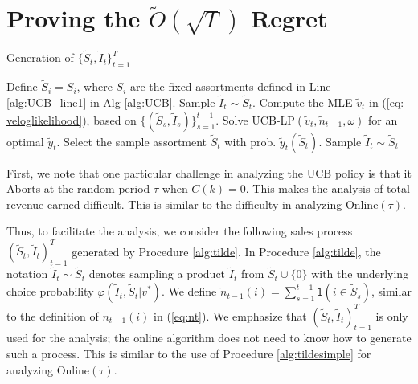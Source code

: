 \documentclass{article}
\makeatletter
\newenvironment{procedure}[1][htb]{%
    \renewcommand{\ALG@name}{Procedure}%
   \begin{algorithm}[#1]%
  }{\end{algorithm}}
\theoremstyle{definition}
\makeatother
\begin{document}
\section{Proving the $\tilde{O}(\sqrt{T})$ Regret}\label{app:pfregretoutline}
\begin{procedure}[t]
\caption{Generation of $\{\tilde{S}_t, \tilde{I}_t\}^T_{t=1}$}\label{alg:tilde}
\begin{algorithmic}[1]
\State Define $\tilde{S}_i = S_i$, where $S_i$ are the fixed assortments defined in Line \ref{alg:UCB_line1} in Alg \ref{alg:UCB}.
\State Sample $\tilde{I}_t \sim \tilde{S}_t$.
\EndFor 
{}
\State Compute the MLE $\tilde{v}_t$ in (\ref{eq:-veloglikelihood}), based on $\{(\tilde{S}_s, \tilde{I}_s)\}^{t-1}_{s = 1}$.
\State Solve UCB-LP$(\tilde{v}_t, \tilde{n}_{t-1}, \omega)$ for an optimal $\tilde{y}_t$.
\State Select the sample assortment $\tilde{S}_t$ with prob. $\tilde{y}_t(\tilde{S}_t)$.\label{alg:tilde_Ut}
\State Sample $\tilde{I}_t\sim \tilde{S}_t$
\EndFor
\end{algorithmic}
\end{procedure}
First, we note that one particular challenge in analyzing the UCB policy is that it {\sc Abort}s at the random period $\tau$ when $C(k) = 0$. This makes the analysis of total revenue earned difficult. This is similar to the difficulty in analyzing {\sc Online}$(\tau)$.

Thus, to facilitate the analysis, we consider the following sales process $(\tilde{S}_t, \tilde{I}_t)^T_{t=1}$ generated by Procedure \ref{alg:tilde}. In Procedure \ref{alg:tilde}, the notation $\tilde{I}_t \sim \tilde{S}_t$ denotes sampling a product $\tilde{I}_t$ from $\tilde{S}_t\cup\{0\}$ with the underlying choice probability $\varphi(\tilde{I}_t, \tilde{S}_t|v^*)$. We define $\tilde{n}_{t-1}(i) = \sum^{t-1}_{s=1}\mathsf{1}(i\in \tilde{S}_s)$, similar to the definition of $n_{t-1}(i)$ in (\ref{eq:nt}). We emphasize that $(\tilde{S}_t, \tilde{I}_t)^T_{t=1}$ is only used for the analysis; the online algorithm does not need to know how to generate such a process. This is similar to the use of Procedure \ref{alg:tildesimple} for analyzing {\sc Online}$(\tau)$.
\end{document}
